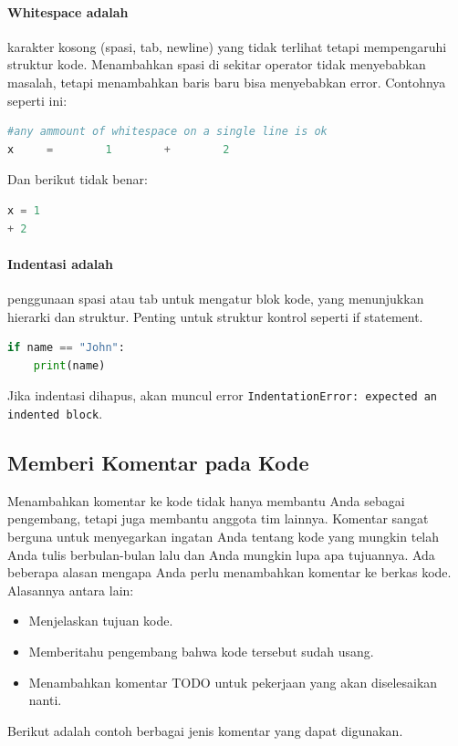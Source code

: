 \documentclass{article}
\begin{document}
\paragraph{Whitespace adalah} karakter kosong (spasi, tab, newline) yang tidak terlihat tetapi mempengaruhi struktur kode. Menambahkan spasi di sekitar operator tidak menyebabkan masalah, tetapi menambahkan baris baru bisa menyebabkan error. Contohnya seperti ini:
\begin{lstlisting}[language=Python, caption={}, captionpos=b]
#any ammount of whitespace on a single line is ok
x     =        1        +        2
\end{lstlisting}
Dan berikut tidak benar:
\begin{lstlisting}[language=Python, caption={}, captionpos=b]
x = 1
+ 2

\end{lstlisting}

\paragraph{Indentasi adalah} penggunaan spasi atau tab untuk mengatur blok kode, yang menunjukkan hierarki dan struktur. Penting untuk struktur kontrol seperti if statement.
\begin{lstlisting}[language=Python, caption={}, captionpos=b]
if name == "John":
    print(name)
\end{lstlisting}
Jika indentasi dihapus, akan muncul error \verb|IndentationError: expected an indented block|.

\subsection{Memberi Komentar pada Kode}
Menambahkan komentar ke kode tidak hanya membantu Anda sebagai pengembang, tetapi juga membantu anggota tim lainnya. Komentar sangat berguna untuk menyegarkan ingatan Anda tentang kode yang mungkin telah Anda tulis berbulan-bulan lalu dan Anda mungkin lupa apa tujuannya. Ada beberapa alasan mengapa Anda perlu menambahkan komentar ke berkas kode. Alasannya antara lain:
\begin{itemize}
    \item Menjelaskan tujuan kode.
    \item Memberitahu pengembang bahwa kode tersebut sudah usang.
    \item Menambahkan komentar TODO untuk pekerjaan yang akan diselesaikan nanti.
\end{itemize}
Berikut adalah contoh berbagai jenis komentar yang dapat digunakan.
\end{document}
